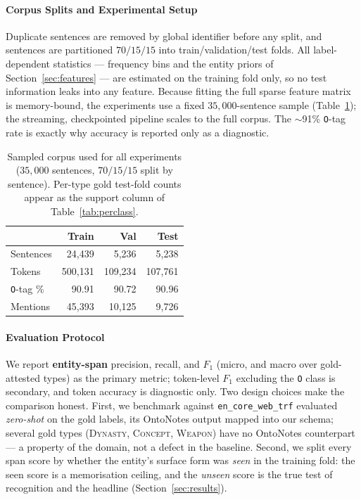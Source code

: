 \documentclass[conference]{IEEEtran}
\begin{document}
\paragraph{Corpus Splits and Experimental Setup}
Duplicate sentences are removed by global identifier before any split, and sentences are partitioned $70/15/15$ into train/validation/test folds. All label-dependent statistics --- frequency bins and the entity priors of Section~\ref{sec:features} --- are estimated on the training fold only, so no test information leaks into any feature. Because fitting the full sparse feature matrix is memory-bound, the experiments use a fixed $35{,}000$-sentence sample (Table~\ref{tab:splitstats}); the streaming, checkpointed pipeline scales to the full corpus. The $\sim$91\% \texttt{O}-tag rate is exactly why accuracy is reported only as a diagnostic.

\begin{table}[!t]
\centering
\caption{Sampled corpus used for all experiments ($35{,}000$ sentences, $70/15/15$ split by sentence). Per-type gold test-fold counts appear as the support column of Table~\ref{tab:perclass}.}
\label{tab:splitstats}
\small
\begin{tabular}{@{}l r r r@{}}
\toprule
 & \textbf{Train} & \textbf{Val} & \textbf{Test} \\
\midrule
Sentences         & 24{,}439  & 5{,}236   & 5{,}238 \\
Tokens            & 500{,}131 & 109{,}234 & 107{,}761 \\
\texttt{O}-tag \% & 90.91     & 90.72     & 90.96 \\
Mentions          & 45{,}393  & 10{,}125  & 9{,}726 \\
\bottomrule
\end{tabular}
\end{table}

\paragraph{Evaluation Protocol}
\label{sec:protocol}
We report \textbf{entity-span} precision, recall, and $F_1$ (micro, and macro over gold-attested types) as the primary metric; token-level $F_1$ excluding the \texttt{O} class is secondary, and token accuracy is diagnostic only. Two design choices make the comparison honest. First, we benchmark against \texttt{en\_core\_web\_trf} evaluated \emph{zero-shot} on the gold labels, its OntoNotes output mapped into our schema; several gold types (\textsc{Dynasty}, \textsc{Concept}, \textsc{Weapon}) have no OntoNotes counterpart --- a property of the domain, not a defect in the baseline. Second, we split every span score by whether the entity's surface form was \emph{seen} in the training fold: the seen score is a memorisation ceiling, and the \emph{unseen} score is the true test of recognition and the headline (Section~\ref{sec:results}).
\end{document}

